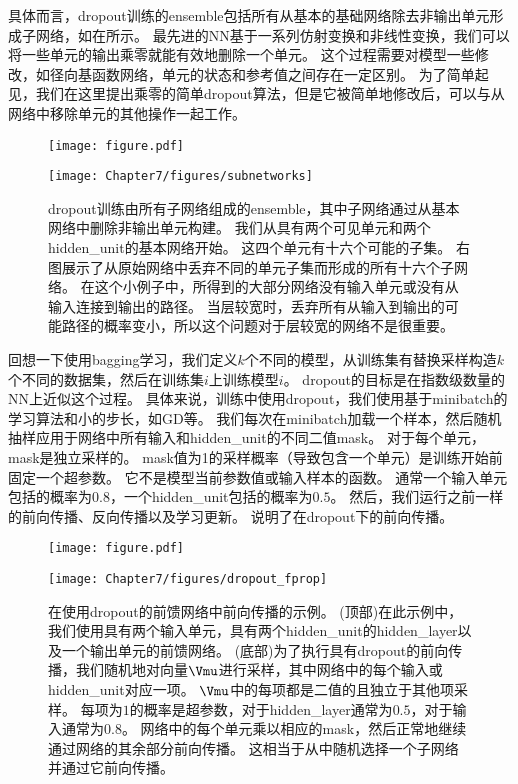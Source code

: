 具体而言，\gls{dropout}训练的\gls{ensemble}包括所有从基本的基础网络除去非输出单元形成子网络，如在所示。
最先进的\gls{NN}基于一系列仿射变换和非线性变换，我们可以将一些单元的输出乘零就能有效地删除一个单元。
这个过程需要对模型一些修改，如径向基函数网络，单元的状态和参考值之间存在一定区别。
为了简单起见，我们在这里提出乘零的简单\gls{dropout}算法，但是它被简单地修改后，可以与从网络中移除单元的其他操作一起工作。
\begin{figure}[!htb]
\ifOpenSource
\centerline{\texttt{[image: figure.pdf]}}
\else
\centerline{\texttt{[image: Chapter7/figures/subnetworks]}}
\fi
\caption{\gls{dropout}训练由所有子网络组成的\gls{ensemble}，其中子网络通过从基本网络中删除非输出单元构建。
我们从具有两个可见单元和两个\gls{hidden_unit}的基本网络开始。
这四个单元有十六个可能的子集。
右图展示了从原始网络中丢弃不同的单元子集而形成的所有十六个子网络。
在这个小例子中，所得到的大部分网络没有输入单元或没有从输入连接到输出的路径。
当层较宽时，丢弃所有从输入到输出的可能路径的概率变小，所以这个问题对于层较宽的网络不是很重要。}
\label{fig:chap7_subnetworks}
\end{figure}


回想一下使用\gls{bagging}学习，我们定义$k$个不同的模型，从训练集有替换采样构造$k$个不同的数据集，然后在训练集$i$上训练模型$i$。
\gls{dropout}的目标是在指数级数量的\gls{NN}上近似这个过程。
具体来说，训练中使用\gls{dropout}，我们使用基于\gls{minibatch}的学习算法和小的步长，如\gls{GD}等。
我们每次在\gls{minibatch}加载一个样本，然后随机抽样应用于网络中所有输入和\gls{hidden_unit}的不同二值\gls{mask}。
对于每个单元，\gls{mask}是独立采样的。
\gls{mask}值为1的采样概率（导致包含一个单元）是训练开始前固定一个超参数。
它不是模型当前参数值或输入样本的函数。
通常一个输入单元包括的概率为$0.8$，一个\gls{hidden_unit}包括的概率为$0.5$。
然后，我们运行之前一样的前向传播、反向传播以及学习更新。
说明了在\gls{dropout}下的前向传播。
\begin{figure}[!htb]
\ifOpenSource
\centerline{\texttt{[image: figure.pdf]}}
\else
\centerline{\texttt{[image: Chapter7/figures/dropout\_fprop]}}
\fi
\caption{在使用\gls{dropout}的前馈网络中前向传播的示例。
(顶部)在此示例中，我们使用具有两个输入单元，具有两个\gls{hidden_unit}的\gls{hidden_layer}以及一个输出单元的前馈网络。
(底部)为了执行具有\gls{dropout}的前向传播，我们随机地对向量$\Vmu$进行采样，其中网络中的每个输入或\gls{hidden_unit}对应一项。
$\Vmu$中的每项都是二值的且独立于其他项采样。
每项为$1$的概率是超参数，对于\gls{hidden_layer}通常为$0.5$，对于输入通常为$0.8$。
网络中的每个单元乘以相应的\gls{mask}，然后正常地继续通过网络的其余部分前向传播。
这相当于从中随机选择一个子网络并通过它前向传播。
}
\label{fig:chap7_dropout_fprop}
\end{figure}

